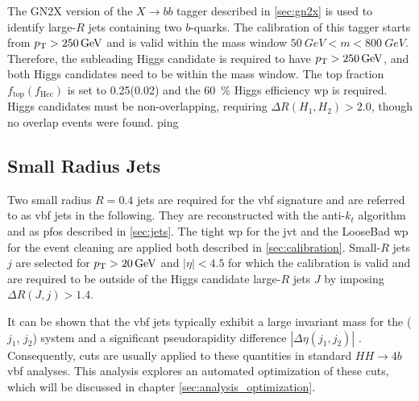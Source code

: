 The GN2X version of the $X\rightarrow bb$ tagger described in \ref{sec:gn2x} is used to identify large-$R$ jets containing two $b$-quarks. The calibration of this tagger starts from $p_{\text{T}}>\qty[]{250}{GeV}$ and is valid within the mass window $\qty[]{50}{GeV}<m<\qty[]{800}{GeV}$. Therefore, the subleading Higgs candidate is required to have $p_{\text{T}}>\qty[]{250}{GeV}$, and both Higgs candidates need to be within the mass window. The top fraction $f_\text{top}(f_\text{Hcc})$ is set to 0.25(0.02) and the \qty[]{60}{\percent} Higgs efficiency \ac{wp} is required. Higgs candidates must be non-overlapping, requiring $\Delta R(H_1, H_2) > 2.0$, though no overlap events were found.
ping
\subsection{Small Radius Jets}
Two small radius $R=0.4$ jets are required for the \ac{vbf} signature and are referred to as \ac{vbf} jets in the following. They are reconstructed with the anti-$k_t$ algorithm and as \acp{pfo} described in \ref{sec:jets}. The tight \ac{wp} for the \ac{jvt} and the LooseBad \ac{wp} for the event cleaning are applied both described in \ref{sec:calibration}. Small-$R$ jets $j$ are selected for $p_{\text{T}}>\qty[]{20}{GeV}$ and $|\eta|<4.5$ for which the calibration is valid and are required to be outside of the Higgs candidate large-$R$ jets $J$ by imposing $\Delta R(J,j) > 1.4$.

It can be shown that the \ac{vbf} jets typically exhibit a large invariant mass for the ($j_1$, $j_2$) system and a significant pseudorapidity difference $|\Delta\eta(j_1,j_2)|$ \citep{rauch2016vectorboson}. Consequently, cuts are usually applied to these quantities in standard $HH\rightarrow 4b$ \ac{vbf} analyses. This analysis explores an automated optimization of these cuts, which will be discussed in chapter \ref{sec:analysis_optimization}.

